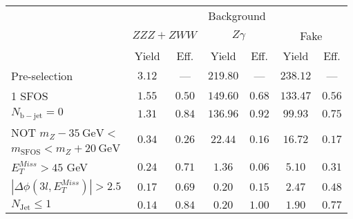 \begin{tabular}{l||c|c||c|c||c|c}
\hline
 &       \multicolumn{6}{c}{Background}\\
 &  \multicolumn{2}{c||}{$ZZZ+ZWW$} & \multicolumn{2}{c||}{$Z\gamma$} & \multicolumn{2}{c}{Fake} \\ 
 & Yield & Eff. & Yield & Eff. & Yield & Eff. \\
\hline\hline
Pre-selection &  $3.12$ & --- &  $219.80$ & --- &  $238.12$ & ---  \\
\hline
1 SFOS &  $1.55$ &  $0.50$ &  $149.60$ &  $0.68$ &  $133.47$ &  $0.56$ \\ 
\hline
$N_{\mathrm{b-jet}} = 0$ &  $1.31$ &  $0.84$ &  $136.96$ &  $0.92$ &  $99.93$ &  $0.75$ \\ 
\hline
NOT $m_Z - 35~\mathrm{GeV} <$  &  \multirow{2}{*}{$0.34$} &  \multirow{2}{*}{$0.26$} &  \multirow{2}{*}{$22.44$} &  \multirow{2}{*}{$0.16$} &  \multirow{2}{*}{$16.72$} &  \multirow{2}{*}{$0.17$} \\ 
$ m_{\mathrm{SFOS}} < m_Z + 20~\mathrm{GeV}$ & & & & & &  \\
\hline
$E_{T}^{Miss} > 45$ GeV &  $0.24$ &  $0.71$ &  $1.36$ &  $0.06$ &  $5.10$ &  $0.31$ \\ 
\hline
$|\Delta\phi(3l,E_{T}^{Miss})| > 2.5$ &  $0.17$ &  $0.69$ &  $0.20$ &  $0.15$ &  $2.47$ &  $0.48$ \\ 
\hline
$N_{\mathrm{Jet}} \leq 1$ &  $0.14$ &  $0.84$ &  $0.20$ &  $1.00$ &  $1.90$ &  $0.77$\\ 
\hline
\end{tabular}
